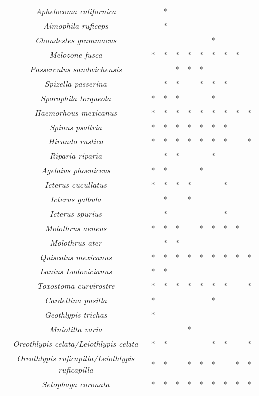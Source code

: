 \documentclass[letterpaper,12pt]{article}
\begin{document}
{\begin{longtable}[c] {|c|c|c|c|c|c|c|c|c|c|}
\textit{Aphelocoma californica} &  & * &  & & & & & & \\
\textit{Aimophila ruficeps} &  & * &  & & & & & & \\
\textit{Chondestes grammacus} &  & &  & & & * & & & \\
\textit{Melozone fusca}& * & * & * & * & * & * & * & * & \\
\textit{Passerculus sandwichensis} &  &  & * & * & * & & & & \\
\textit{Spizella passerina} &  & * & * & & * & * & * & & \\
\textit{Sporophila torqueola} & * & * & * & & & * & & & \\
\textit{Haemorhous mexicanus} & * & * & * & * & * & * & * & * & *  \\
\textit{Spinus psaltria} & * & * & * & * & * & * & * & & \\
\textit{Hirundo rustica} & * & * & * & * & * & * & * & & * \\
\textit{Riparia riparia} &  &  * & * & & &* & & & \\
\textit{Agelaius phoeniceus} & * & * &  &  & * & & & & \\ 
\textit{Icterus cucullatus} & * &  * & * & * & & & * & &\\
\textit{Icterus galbula} &  & * &  & * & & & &\\
\textit{Icterus spurius} &  &  * &  & & & & * & &\\
\textit{Molothrus aeneus} & * & * & * & & * & * & * & * & \\
\textit{Molothrus ater} &  & * & * & & & & & & \\
\textit{Quiscalus mexicanus} & * & * & * & * & * & * & * & * & * \\
\textit{Lanius Ludovicianus} & * & * &  & & & & & & \\
\textit{Toxostoma curvirostre} & * &  * & * & * & * & * & * & &* \\
\textit{Cardellina pusilla} & * & &  & & & * & & & \\
\textit{Geothlypis trichas} & * &   &  & & & & & & \\
\textit{Mniotilta varia} &  &  &  & * & & & & & \\
\textit{Oreothlypis celata/Leiothlypis celata} & * & * &  & & & * & * & &* \\
\textit{Oreothlypis ruficapilla/Leiothlypis ruficapilla} & * & * &  & * & * & * & &* &* \\
\textit{Setophaga coronata} & * & * & * & * & * & * & * & * & *\\

\end{longtable}}
\end{document}
